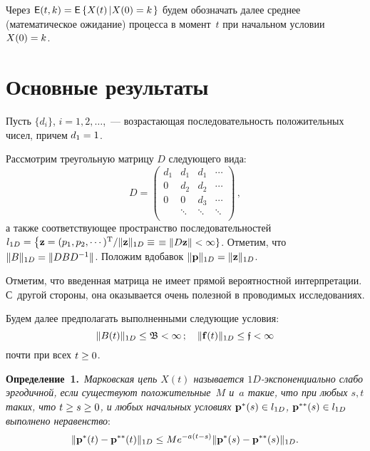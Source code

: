 \begin{multicols}{2}
Через  ${\sf E}(t,k) = {\sf E}\left\{X(t)\left|X(0)=k\right.\right\}$
будем обозначать далее среднее (математическое ожидание)
процесса в момент~$t$ при начальном условии $X(0)\hm=k$.

\section{Основные результаты}

Пусть $\{d_i\}$, $i=1,2, \dots$,~--- возрастающая последовательность
положительных чисел, причем $d_1\hm = 1$.

Рассмотрим треугольную матрицу $D$ следующего вида:
\begin{equation*}
D=\begin{pmatrix}
d_1   & d_1 & d_1 & \cdots  \\
0   & d_2  & d_2  &   \cdots  \\
0   & 0  & d_3  &   \cdots  \\
& \ddots & \ddots & \ddots \\
\end{pmatrix}\,, 
\end{equation*}
а также соответствующее пространство последовательностей
$l_{1D}\hm=\left\{{\bf z} \hm= (p_1,p_2,\cdots)^{\mathrm{T}} / \|{\bf z}\|_{1D}
\hm\equiv\right.$\linebreak $\left.\equiv \|D {\bf z}\| \hm<\infty \right\}$. Отметим, что  $\|B\|_{1D} \hm=
\|DBD^{-1}\|$. Положим вдобавок $\|{\bf p}\|_{1D}\hm = \|{\bf z}\|_{1D}$.


Отметим, что введенная матрица  не имеет прямой вероятностной интерпретации.
С~другой стороны, она оказывается очень полезной в проводимых исследованиях.




Будем далее предполагать выполненными следующие условия:
\begin{equation*}
\|B(t)\|_{1D} \le  \mathfrak{B}< \infty\,; \quad  \|{\bf f}(t)\|_{1D} \le \mathfrak{f}< \infty
\end{equation*}
\noindent почти при всех $t \hm\ge 0$.

\medskip

\noindent

\noindent
\textbf{Определение~1.}\
\textit{Марковская цепь $X(t)$ называется $1D$-экс\-по\-нен\-ци\-аль\-но слабо
эргодичной, если существуют
положительные~$M$ и~$a$ такие, что при любых  $s,t$ таких, что $t\hm\ge s \hm\ge 0$,
и любых начальных условиях
 ${\bf p^{*}}(s) \hm\in l_{1D}$, ${\bf p^{**}}(s) \hm\in l_{1D}$ выполнено неравенство}:
\begin{equation*}
\|{\bf p^{*}}(t) - {\bf p^{**}}(t)\|_{1D} \le M
e^{-a\left(t-s\right)} \|{\bf p^{*}}(s) - {\bf p^{**}}(s)\|_{1D}.
\end{equation*}


\end{multicols}

